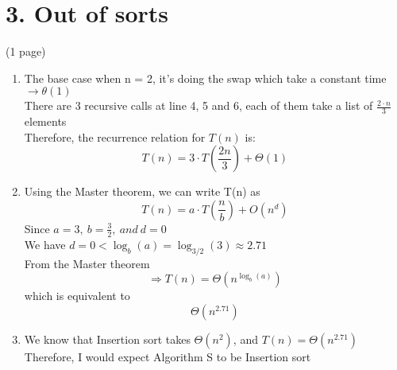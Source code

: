 \documentclass[11pt]{article}
\newenvironment{qparts}{\begin{enumerate}[{(}a{)}]}{\end{enumerate}}
\begin{document}
\newpage
\section*{3. Out of sorts} (1 page)
\begin{qparts}
\Large{}
\item %
The base case when n = 2, it's doing the swap which take a constant time $\rightarrow \theta(1)$
\\
There are 3 recursive calls at line 4, 5 and 6, each of them take a list of $\frac{2\cdot n}{3}$ elements
\\
Therefore, the recurrence relation for $T(n)$ is:
$$\boxed{T(n) = 3\cdot T(\frac{2n}{3}) + \Theta(1)}$$

\item %
Using the Master theorem, we can write T(n) as
$$T(n) = a \cdot T(\frac{n}{b}) + O(n^d) $$
Since $a = 3,\ b = \frac{3}{2},\ and \ d = 0$
\\
We have $d = 0 < \log_b(a) = \log_{3/2}(3) \approx 2.71$
\\
From the Master theorem
$$\Longrightarrow T(n) = \Theta(n^{\log_b(a)})$$
which is equivalent to $$\boxed{\Theta{(n^{2.71})}}$$

\item %
We know that Insertion sort takes $\Theta(n^2)$, and $T(n) = \Theta{(n^{2.71})}$\\
Therefore, I would expect Algorithm S to be  Insertion sort

\end{qparts}

\newpage
\end{document}
